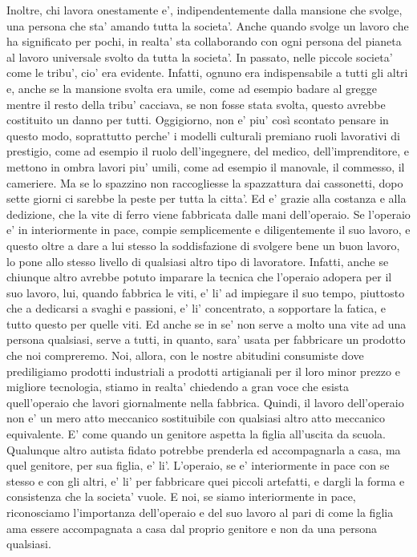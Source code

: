 Inoltre, chi lavora onestamente e', indipendentemente dalla mansione che svolge, una persona che sta' amando tutta la societa'. Anche quando svolge un lavoro che ha significato per pochi, in realta' sta collaborando con ogni persona del pianeta al lavoro universale svolto da tutta la societa'. 
In passato, nelle piccole societa' come le tribu', cio' era evidente. Infatti, ognuno era indispensabile a tutti gli altri e, anche se la mansione svolta era umile, come ad esempio badare al gregge mentre il resto della tribu' cacciava,  se non fosse stata svolta, questo avrebbe costituito un danno per tutti.
Oggigiorno, non e' piu' così scontato pensare in questo modo, soprattutto perche' i modelli culturali premiano ruoli lavorativi di prestigio, come ad esempio il ruolo dell'ingegnere, del medico, dell'imprenditore, e mettono in ombra lavori piu' umili, come ad esempio il manovale, il commesso, il cameriere. 
Ma se lo spazzino non raccogliesse la spazzattura dai cassonetti, dopo sette giorni ci sarebbe la peste per tutta la citta'. Ed e' grazie alla costanza e alla dedizione, che la vite di ferro viene fabbricata dalle mani dell'operaio. Se l'operaio e' in interiormente in pace, compie semplicemente e diligentemente il suo lavoro, e questo oltre a dare a lui stesso la soddisfazione di svolgere bene un buon lavoro, lo pone allo stesso livello di qualsiasi altro tipo di lavoratore. 
Infatti, anche se chiunque altro avrebbe potuto imparare la tecnica che l'operaio adopera per il suo lavoro, lui, quando fabbrica le viti, e' li' ad impiegare il suo tempo, piuttosto che a dedicarsi a svaghi e passioni, e' li' concentrato, a sopportare la fatica, e tutto questo per quelle viti. 
Ed anche se in se' non serve a molto una vite ad una persona qualsiasi, serve a tutti, in quanto, sara' usata per fabbricare un prodotto che noi compreremo. 
Noi, allora, con le nostre abitudini consumiste dove prediligiamo prodotti industriali a prodotti artigianali per il loro minor prezzo e migliore tecnologia, stiamo in realta' chiedendo a gran voce che esista quell'operaio che lavori giornalmente nella fabbrica.
Quindi, il lavoro dell'operaio non e' un mero atto meccanico sostituibile con qualsiasi altro atto meccanico equivalente. E' come quando un genitore aspetta la figlia all'uscita da scuola. Qualunque altro autista fidato potrebbe prenderla ed accompagnarla a casa, ma quel genitore, per sua figlia, e' li'. 
L'operaio, se e' interiormente in pace con se stesso e con gli altri, e' li' per fabbricare quei piccoli artefatti, e dargli la forma e consistenza che la societa' vuole. E noi, se siamo interiormente in pace, riconosciamo l'importanza dell'operaio e del suo lavoro al pari di come la figlia ama essere accompagnata a casa dal proprio genitore e non da una persona qualsiasi.


